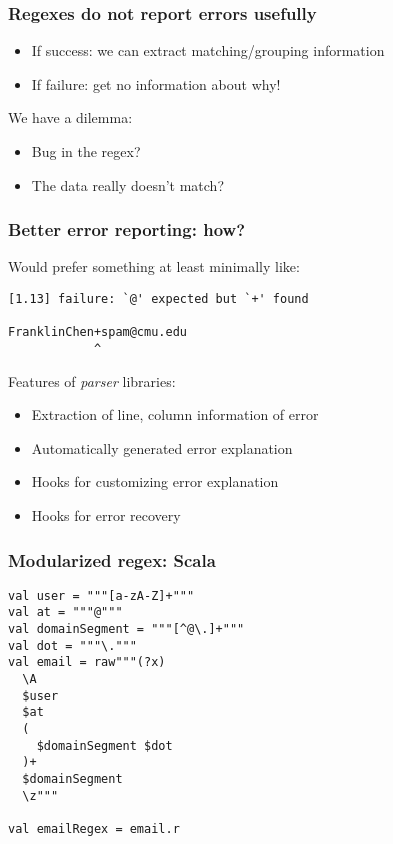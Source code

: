 \begin{frame}
  \frametitle{Regexes do not report errors usefully}

  \begin{itemize}
    \item If success: we can extract matching/grouping information
    \item If failure: get no information about why!
  \end{itemize}

%
%
%

  We have a dilemma:
  \begin{itemize}
    \item Bug in the regex?
    \item The data really doesn't match?
  \end{itemize}

\end{frame}

\begin{frame}[fragile]
  \frametitle{Better error reporting: how?}

  Would prefer something at least minimally like:

  \begin{verbatim}
[1.13] failure: `@' expected but `+' found

FranklinChen+spam@cmu.edu
            ^
  \end{verbatim}

  Features of \emph{parser} libraries:
  \begin{itemize}
    \item Extraction of line, column information of error
    \item Automatically generated error explanation
    \item Hooks for customizing error explanation
    \item Hooks for error recovery
  \end{itemize}
\end{frame}


%
%

\begin{frame}[fragile]
  \frametitle{Modularized regex: Scala}

  \begin{verbatim}
val user = """[a-zA-Z]+"""
val at = """@"""
val domainSegment = """[^@\.]+"""
val dot = """\."""
val email = raw"""(?x)
  \A
  $user
  $at
  (
    $domainSegment $dot
  )+
  $domainSegment
  \z"""

val emailRegex = email.r
  \end{verbatim}

\end{frame}

